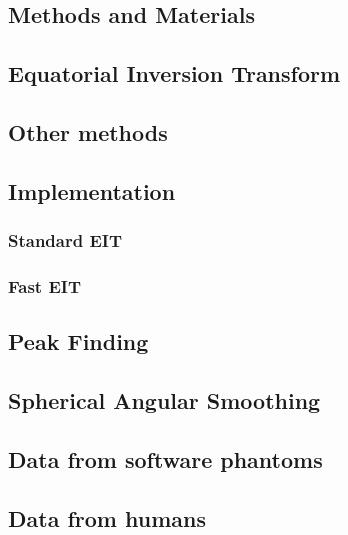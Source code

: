 \documentclass{bioinfo}
\begin{document}
\begin{methods}

\section{Methods and Materials}

\subsection{Equatorial Inversion Transform}

\subsection{Other methods}

\subsection{Implementation }

\subsubsection{Standard EIT\label{sub:Standard-EIT}}

\subsubsection{Fast EIT}

\subsection{Peak Finding\label{sub:Peak-Finding}}

\subsection{Spherical Angular Smoothing\label{sub:Spherical-Angular-Smoothing}}

\subsection{Data from software phantoms}

\subsection{Data from humans}

\end{methods}
\end{document}
